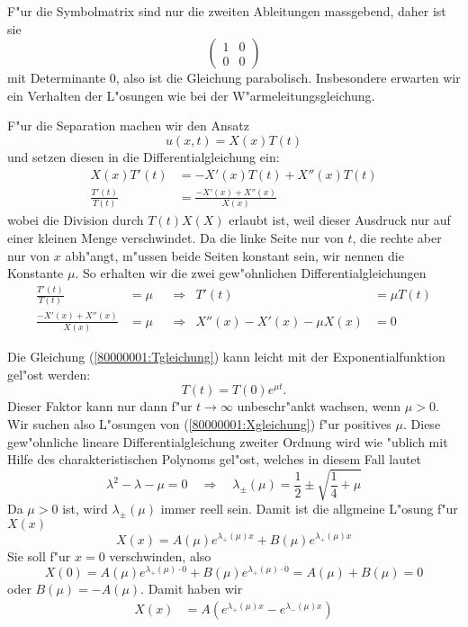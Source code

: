 \begin{loesung}
\begin{teilaufgaben}
\item F"ur die Symbolmatrix sind nur die zweiten Ableitungen massgebend,
daher ist sie
\[
\begin{pmatrix}
1&0\\
0&0
\end{pmatrix}
\]
mit Determinante $0$, also ist die Gleichung parabolisch.
Insbesondere erwarten wir ein Verhalten der L"osungen wie
bei der W"armeleitungsgleichung.
\item F"ur die Separation machen wir den Ansatz
\[
u(x,t)=X(x)T(t)
\]
und setzen diesen in die Differentialgleichung ein:
\begin{align*}
X(x)T'(t)&=-X'(x)T(t)+X''(x)T(t)\\
\frac{T'(t)}{T(t)}&=\frac{-X'(x)+X''(x)}{X(x)}
\end{align*}
wobei die Division durch $T(t)X(X)$ erlaubt ist, weil
dieser Ausdruck nur auf einer kleinen Menge verschwindet.
Da die linke Seite nur von $t$, die rechte aber nur von $x$ abh"angt,
m"ussen beide Seiten konstant sein, wir nennen die Konstante
$\mu$. So erhalten wir die zwei gew"ohnlichen Differentialgleichungen
\begin{align}
\frac{T'(t)}{T(t)}&=\mu&&\Rightarrow&T'(t)&=\mu T(t)
\label{80000001:Tgleichung}
\\
\frac{-X'(x)+X''(x)}{X(x)}&=\mu&&\Rightarrow&X''(x)-X'(x)-\mu X(x)&=0
\label{80000001:Xgleichung}
\end{align}
\item
Die Gleichung (\ref{80000001:Tgleichung}) kann leicht mit der Exponentialfunktion
gel"ost werden:
\[
T(t)=T(0)e^{\mu t}.
\]
Dieser Faktor kann nur dann f"ur $t\to\infty$ unbeschr"ankt wachsen, wenn
$\mu > 0$. Wir suchen also L"osungen von (\ref{80000001:Xgleichung}) f"ur
positives $\mu$.
Diese gew"ohnliche lineare Differentialgleichung zweiter Ordnung wird
wie "ublich mit Hilfe des charakteristischen Polynoms gel"ost, welches
in diesem Fall lautet
\[
\lambda^2-\lambda-\mu=0
\quad
\Rightarrow
\quad
\lambda_{\pm}(\mu)=\frac12\pm\sqrt{\frac14+\mu}
\]
Da $\mu > 0$ ist, wird $\lambda_{\pm}(\mu)$ immer reell sein.
Damit ist die allgmeine L"osung f"ur $X(x)$
\[
X(x)=
A(\mu)e^{\lambda_+(\mu)x}
+
B(\mu)e^{\lambda_+(\mu)x}
\]
Sie soll f"ur $x=0$ verschwinden, also
\[
X(0)=
A(\mu)e^{\lambda_+(\mu)\cdot 0}
+
B(\mu)e^{\lambda_+(\mu)\cdot 0}
=A(\mu)+B(\mu)=0
\]
oder $B(\mu)=-A(\mu)$. Damit haben wir
\begin{align*}
X(x)&=A(e^{\lambda_+(\mu)x}-e^{\lambda_-(\mu)x})

\end{align*}
\end{teilaufgaben}
\end{loesung}
